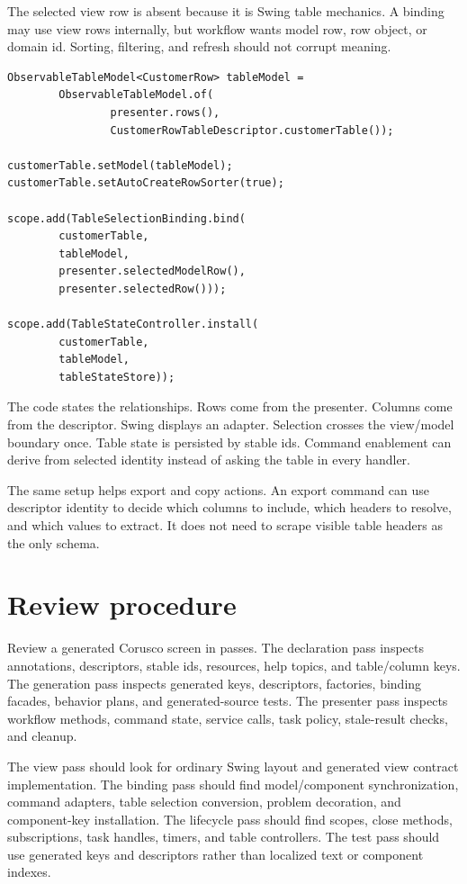 The selected view row is absent because it is Swing table mechanics. A binding may use view rows internally, but workflow wants model row, row object, or domain id. Sorting, filtering, and refresh should not corrupt meaning.

\begin{lstlisting}[caption={The view installs table adapters under scope ownership.}]
ObservableTableModel<CustomerRow> tableModel =
        ObservableTableModel.of(
                presenter.rows(),
                CustomerRowTableDescriptor.customerTable());

customerTable.setModel(tableModel);
customerTable.setAutoCreateRowSorter(true);

scope.add(TableSelectionBinding.bind(
        customerTable,
        tableModel,
        presenter.selectedModelRow(),
        presenter.selectedRow()));

scope.add(TableStateController.install(
        customerTable,
        tableModel,
        tableStateStore));
\end{lstlisting}

The code states the relationships. Rows come from the presenter. Columns come from the descriptor. Swing displays an adapter. Selection crosses the view/model boundary once. Table state is persisted by stable ids. Command enablement can derive from selected identity instead of asking the table in every handler.

The same setup helps export and copy actions. An export command can use descriptor identity to decide which columns to include, which headers to resolve, and which values to extract. It does not need to scrape visible table headers as the only schema.

\section{Review procedure}

Review a generated Corusco screen in passes. The declaration pass inspects annotations, descriptors, stable ids, resources, help topics, and table/column keys. The generation pass inspects generated keys, descriptors, factories, binding facades, behavior plans, and generated-source tests. The presenter pass inspects workflow methods, command state, service calls, task policy, stale-result checks, and cleanup.

The view pass should look for ordinary Swing layout and generated view contract implementation. The binding pass should find model/component synchronization, command adapters, table selection conversion, problem decoration, and component-key installation. The lifecycle pass should find scopes, close methods, subscriptions, task handles, timers, and table controllers. The test pass should use generated keys and descriptors rather than localized text or component indexes.

